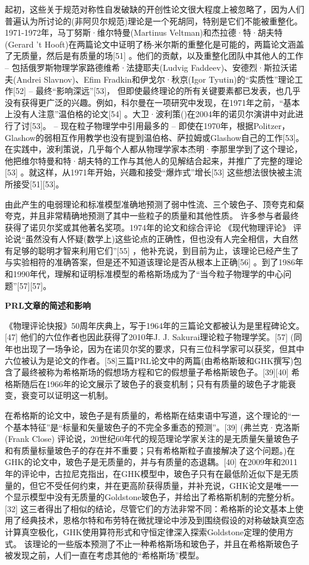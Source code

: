 起初，这些关于规范对称性自发破缺的开创性论文很大程度上被忽略了，因为人们普遍认为所讨论的(非阿贝尔规范)理论是一个死胡同，特别是它们不能被重整化。1971-1972年，马丁努斯·维尔特曼(Martinus Veltman)和杰拉德·特·胡夫特(Gerard 't Hooft)在两篇论文中证明了杨-米尔斯的重整化是可能的，两篇论文涵盖了无质量，然后是有质量的场[51] 。他们的贡献，以及重整化团队中其他人的工作 – 包括俄罗斯物理学家路德维希·法捷耶夫(Ludvig Faddeev)、安德烈·斯拉沃诺夫(Andrei Slavnov)、Efim Fradkin和伊戈尔·秋京(Igor Tyutin)的“实质性”理论工作[52] – 最终“影响深远”[53]， 但即使最终理论的所有关键要素都已发表，也几乎没有获得更广泛的兴趣。例如，科尔曼在一项研究中发现，在1971年之前，“基本上没有人注意”温伯格的论文[54] 。大卫·波利策()在2004年的诺贝尔演讲中对此进行了讨[53]。 – 现在粒子物理学中引用最多的  – 即使在1970年，根据Politzer，Glashow的弱相互作用教学也没有提到温伯格、萨拉姆或Glashow自己的工作[53]。 在实践中，波利策说，几乎每个人都从物理学家本杰明·李那里学到了这个理论，他把维尔特曼和特·胡夫特的工作与其他人的见解结合起来，并推广了完整的理论[53] 。就这样，从1971年开始，兴趣和接受“爆炸式”增长[53] 这些想法很快被主流所接受[51][53]。

由此产生的电弱理论和标准模型准确地预测了弱中性流、三个玻色子、顶夸克和粲夸克，并且非常精确地预测了其中一些粒子的质量和其他性质。 许多参与者最终获得了诺贝尔奖或其他著名奖项。1974年的论文和综合评论 《现代物理评论》 评论说“虽然没有人怀疑(数学上)这些论点的正确性，但也没有人完全相信，大自然有足够的聪明才智来利用它们”[55] ，他补充说，到目前为止，该理论已经产生了与实验相符的准确答案，但是还不知道该理论是否从根本上正确[56] 。到了1986年和1990年代，理解和证明标准模型的希格斯场成为了“当今粒子物理学的中心问题”[57][57]。

\textbf{PRL文章的简述和影响}

《物理评论快报》50周年庆典上，写于1964年的三篇论文都被认为是里程碑论文。[47] 他们的六位作者也因此获得了2010年J. J. Sakurai理论粒子物理学奖。[57] (同年也出现了一场争论，因为在诺贝尔奖的要求，只有三位科学家可以获奖，但其中六位被认为是论文的作者。[58]三篇PRL论文中的两篇(由希格斯玻和GHK撰写)包含了最终被称为希格斯场的假想场方程和它的假想量子希格斯玻色子。[39][40] 希格斯随后在1966年的论文展示了玻色子的衰变机制；只有有质量的玻色子才能衰变，衰变可以证明这一机制。

在希格斯的论文中，玻色子是有质量的，希格斯在结束语中写道，这个理论的“一个基本特征”是“标量和矢量玻色子的不完全多重态的预测”。[39] (弗兰克·克洛斯(Frank Close) 评论说，20世纪60年代的规范理论学家关注的是无质量矢量玻色子和有质量标量玻色子的存在并不重要；只有希格斯粒子直接解决了这个问题。)在GHK的论文中，玻色子是无质量的，并与有质量的态退耦。[40] 在2009年和2011年的评论中，古拉尼克指出，在GHK模型中，玻色子只有在最低阶近似下是无质量的，但它不受任何约束，并在更高阶获得质量，并补充说，GHK论文是唯一一个显示模型中没有无质量的Goldstone玻色子，并给出了希格斯机制的完整分析。[32] 这三者得出了相似的结论，尽管它们的方法非常不同：希格斯的论文基本上使用了经典技术，恩格尔特和布劳特在微扰理论中涉及到围绕假设的对称破缺真空态计算真空极化，GHK使用算符形式和守恒定律深入探索Goldstone定理的使用方式。 该理论的一些版本预测了不止一种希格斯场和玻色子，并且在希格斯玻色子被发现之前，人们一直在考虑其他的“希格斯场”模型。

